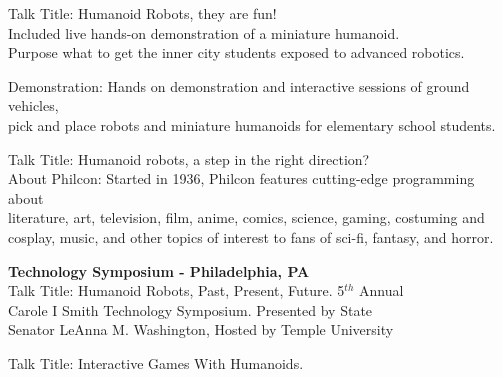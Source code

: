\begin{resume}
\begin{position}
Talk Title: Humanoid Robots, they are fun!\\ 
Included live hands-on demonstration of a miniature humanoid. \\ 
Purpose what to get the inner city students exposed to advanced robotics.
\end{position}





\begin{position}
Demonstration: Hands on demonstration and interactive sessions of ground vehicles,\\
pick and place robots and miniature humanoids for elementary school students.
\end{position}

\begin{position}
Talk Title: Humanoid robots, a step in the right direction?\\
About Philcon: Started in 1936, Philcon features cutting-edge programming about\\
literature, art, television, film, anime, comics, science, gaming, costuming and\\
cosplay, music, and other topics of interest to fans of sci-fi, fantasy, and horror.
\end{position}


\begin{position}
\textbf{Technology Symposium - Philadelphia, PA}\\
Talk Title: Humanoid Robots, Past, Present, Future.  5$^{th}$ Annual\\ 
Carole I Smith Technology Symposium. Presented by State 
\\Senator LeAnna M. Washington, Hosted by Temple University
\end{position}






\begin{position}
Talk Title: Interactive Games With Humanoids.  
\end{position}




\end{resume}
